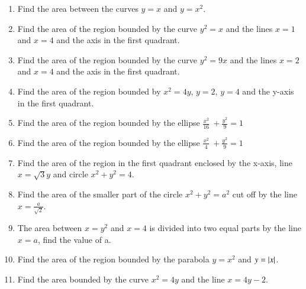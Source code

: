 \begin{enumerate}[label=\thesubsection.\arabic*,ref=\thesubsection.\theenumi]
\item 
Find the area between the curves $y=x$ and $y=x^2$.
\\
\solution
\label{chapters/12/8/3/2}

\item 
Find the area of the region bounded by the curve $y^2=x$ and the lines $x=1$ and $x=4$ and the axis in the first quadrant.
\label{chapters/12/8/1/1}
	\\
	\solution

\item 
Find the area of the region bounded by the curve $y^2=9x$ and the lines $x=2$ and $x=4$ and the axis in the first quadrant.
\\
\solution
\label{chapters/12/8/1/2}

\item Find the area of the region bounded by ${x}^2
= 4{y}$, ${y} = 2$, ${y} = 4$ and the y-axis in the
first quadrant.
\label{chapters/12/8/1/3}
\item Find the area of the region bounded by the ellipse \(\frac{{x}^2}{16}\ + \frac{{y}^2}{9} = 1\)
\label{chapters/12/8/1/4}
\item Find the area of the region bounded by the ellipse \(\frac{{x}^2}{4}\ + \frac{{y}^2}{9} = 1\)
\label{chapters/12/8/1/5}
\item 
		  Find the area of the region in the first quadrant enclosed by the x-axis, line $x=\sqrt{3}y$ and circle $x^2+y^2=4$.
		  \\
		  \solution
\label{chapters/12/8/1/6}

\item 
	Find the area of the smaller part of the circle $x^2+y^2=a^2 $ cut off by the line $x=\frac{a}{\sqrt{2}}$.
	\\
	\solution
\label{chapters/12/8/1/7}

\item 
The area between $x = y^2$ and $x = 4$ is divided into two equal parts by the line $x = a$, find the value of a.
\\
\solution
\label{chapters/12/8/1/8}

\item 
	Find the area of the region bounded by the parabola $y=x^2$ and $y= \left\vert x\right\vert$.
\label{chapters/12/8/1/9}
\item 
Find the area bounded by the curve $x^2=4y$ and the line $x=4y-2$.
\\
\solution 
\label{chapters/12/8/1/10}

\end{enumerate}
